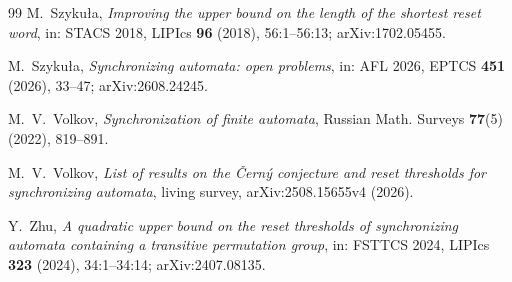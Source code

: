 \documentclass[11pt,a4paper]{article}
\theoremstyle{definition}
\theoremstyle{remark}
\begin{document}
\begin{thebibliography}{99}
M.~Szyku\l a, \emph{Improving the upper bound on the length of the shortest reset word}, in: STACS 2018, LIPIcs \textbf{96} (2018), 56:1--56:13; arXiv:1702.05455.

M.~Szyku\l a, \emph{Synchronizing automata: open problems}, in: AFL 2026, EPTCS \textbf{451} (2026), 33--47; arXiv:2608.24245.

M.~V.~Volkov, \emph{Synchronization of finite automata}, Russian Math. Surveys \textbf{77}(5) (2022), 819--891.

M.~V.~Volkov, \emph{List of results on the \v{C}ern\'y conjecture and reset thresholds for synchronizing automata}, living survey, arXiv:2508.15655v4 (2026).

Y.~Zhu, \emph{A quadratic upper bound on the reset thresholds of synchronizing automata containing a transitive permutation group}, in: FSTTCS 2024, LIPIcs \textbf{323} (2024), 34:1--34:14; arXiv:2407.08135.

\end{thebibliography}
\end{document}
